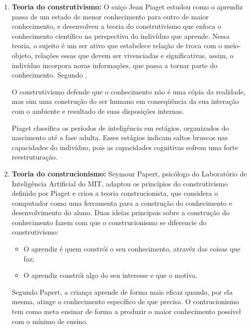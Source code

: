 \begin{enumerate}
\item \textbf{Teoria do construtivismo:} O suiço Jean Piaget estudou como o aprendiz passa de um estado de menor conhecimento para outro de maior conhecimento, e desenvolveu a teoria do construtivismo que enfoca o conhecimento científico na perspectiva do indivíduo que aprende. Nessa teoria, o sujeito é um ser ativo que estabelece relação de troca com o meio-objeto, relações essas que devem ser vivenciadas e significativas, assim, o indivíduo incorpora novas informações, que passa a tornar parte do conhecimento. Segundo \cite{zilli2004robotica}, 

\begin{citacao}
O construtivismo defende que o conhecimento não é uma cópia da realidade, mas sim
uma construção do ser humano em conseqüência da sua interação com o ambiente e resultado de suas disposições internas.
\end{citacao} 

Piaget classifica os períodos de inteligência em estágios, organizados do nascimento até a fase adulta. Esses estágios indicam saltos bruscos nas capacidades do indivíduo, pois as capacidades cognitivas sofrem uma forte reestruturação.

\item \textbf{Teoria do construcionismo:} Seymour Papert, psicólogo do Laboratório de Inteligência Artificial do MIT, adaptou os princípios do construtivismo definido por Piaget e criou a teoria construcionista, que considera o computador como uma ferramenta para a construção do conhecimento e desenvolvimento do aluno. Duas ideias principais sobre a construção do conhecimento fazem com que o construcionismo se diferencie do construtivismo:
\begin{itemize}
\item O aprendiz é quem constrói o seu conhecimento, atravéz das coisas que faz;
\item O aprendiz constrói algo do seu interesse e que o motiva. 
\end{itemize} 
Segundo Papert, a criança aprende de forma mais eficaz quando, por ela mesma, atinge o conhecimento específico de que precisa. O contrucionismo tem como meta ensinar de forma a produzir o maior conhecimento possível com o mínimo de ensino.
\end{enumerate}

